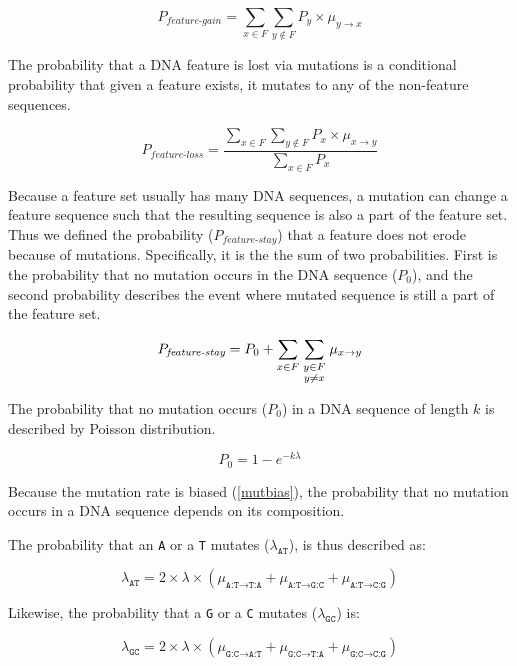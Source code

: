 \documentclass[12pt,a4paper]{article}
\begin{document}
\begin{equation}
P_\textit{feature-gain} = \sum_{x \in F} \sum_{y \notin F} P_y \times \mu_{y\to x}
\end{equation}

The probability that a DNA feature is lost via mutations is a conditional probability that given a feature exists, it mutates to any of the non-feature sequences. 

\begin{equation}
P_\textit{feature-loss} = \frac{\displaystyle\sum_{x \in F} \sum_{y \notin F} P_x \times \mu_{x\to y}}{\displaystyle\sum_{x \in F} P_x}
\end{equation}

Because a feature set usually has many DNA sequences, a mutation can change a feature sequence such that the resulting sequence is also a part of the feature set. Thus we defined the probability ($P_\textit{feature-stay}$) that a feature does not erode because of mutations. Specifically, it is the the sum of two probabilities. First is the probability that no mutation occurs in the DNA sequence ($P_0$), and the second probability describes the event where mutated sequence is still a part of the feature set.

\begin{equation}
P_\textit{feature-stay} = P_0 + \sum_{x \in F} \sum_{\genfrac{}{}{0pt}{1}{y \in F}{y\neq x}} \mu_{x\to y}
\end{equation}


The probability that no mutation occurs ($P_0$) in a DNA sequence of length $k$ is described by Poisson distribution. 

$$P_0 = 1-e^{-k\lambda}$$

Because the mutation rate is biased (\autoref{mutbias}), the probability that no mutation occurs in a DNA sequence depends on its composition. 

The probability that an \texttt{A} or a \texttt{T} mutates ($\lambda_\texttt{AT}$), is thus described as:

$$\lambda_\texttt{AT} = 2\times\lambda\times(\mu_{\texttt{A:T}\to\texttt{T:A}} + \mu_{\texttt{A:T}\to\texttt{G:C}} + \mu_{\texttt{A:T}\to\texttt{C:G}})$$

Likewise, the probability that a \texttt{G} or a \texttt{C} mutates ($\lambda_\texttt{GC}$) is: 

\vspace{-1ex}

$$\lambda_\texttt{GC} = 2\times\lambda\times(\mu_{\texttt{G:C}\to\texttt{A:T}} + \mu_{\texttt{G:C}\to\texttt{T:A}} + \mu_{\texttt{G:C}\to\texttt{C:G}})$$
\end{document}
